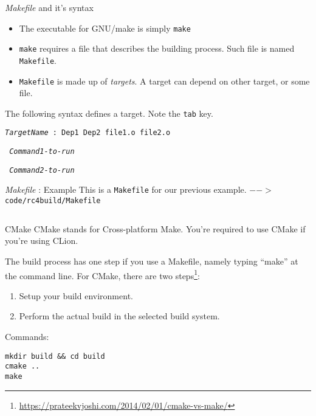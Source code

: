 \begin{frame}{\textit{Makefile} and it's syntax}
\begin{itemize}
	\item The executable for GNU/make is simply \texttt{make}
	\item \texttt{make} requires a file that describes the building process. Such file is named \texttt{Makefile}. 
	\item \texttt{Makefile} is made up of \textit{targets}. A target can depend on other target, or some file.
\end{itemize}

The following syntax defines a target. Note the \texttt{tab} key.

\vspace{0.1in}

\texttt{\textit{TargetName} : Dep1 Dep2 file1.o file2.o}

\texttt{\keys{\tab} \textit{Command1-to-run}}

\texttt{\keys{\tab} \textit{Command2-to-run}}

\end{frame}

\begin{frame}{\textit{Makefile} : Example}
This is a \texttt{Makefile} for our previous example.
\texttt{$-->$ code/rc4build/Makefile}
\inputminted{make}{code/rc4build/Makefile}
\end{frame}





\begin{frame}[fragile]{CMake}
CMake stands for Cross-platform Make. You're required to use CMake if you're using CLion.

The build process has one step if you use a Makefile, namely typing “make” at the command line. For CMake, there are two steps\footnote{\url{https://prateekvjoshi.com/2014/02/01/cmake-vs-make/}}: 
\begin{enumerate}
    \item Setup your build environment.
    \item Perform the actual build in the selected build system.
\end{enumerate}

Commands:
\begin{verbatim}
mkdir build && cd build
cmake ..
make
\end{verbatim}

\end{frame}


